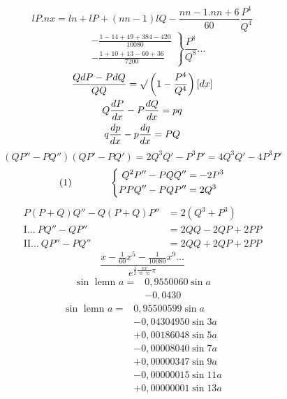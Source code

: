 \begingroup
\setlength{\headheight}{25pt}
\NoSourceHead
{}
\noindent [S. 26]
{\small\[\begin{aligned}
P.nx={}&nQ^{nn-1}P-\frac{n.nn-1.nn+6}{60}Q^{nn-5}P^5\\
&-\frac{n^6-13n^4+36nn+420n.nn-1}{10080}Q^{nn-9}P^9\ldots
\end{aligned}\]}
\[lP.nx=ln+lP+(nn-1)lQ-\frac{nn-1.nn+6}{60}\frac{P^4}{Q^4}\]
\[\left.\begin{aligned}
&-\frac{1-14+49+384-420}{10080}\\[5pt]
&-\frac{1+10+13-60+36}{7200}
\end{aligned}\right\}\frac{P^8}{Q^8}\ldots\]
\noindent [S. 78]
\[\begin{gathered}
\frac{QdP-PdQ}{QQ}=\surd\left(1-\frac{P^4}{Q^4}\right)[dx]\\
Q\frac{dP}{dx}-P\frac{dQ}{dx}=pq\\
q\frac{dp}{dx}-p\frac{dq}{dx}=PQ
\end{gathered}\]
{\small\[(QP''-PQ'')(QP'-PQ')=2Q^3Q'-P^3P'=4Q^3Q'-4P^3P'\]}
\[\begin{array}{l@{\qquad\qquad}l}
(1)&\left\{\begin{aligned}
Q^2P''-PQQ''&=-2P^3\\
PPQ''-PQP''&=2Q^3
\end{aligned}\right.
\end{array}\]
\clearpage
{}
\[\begin{aligned}
P(P+Q)Q''-Q(P+Q)P''&=2(Q^3+P^3)\\
\mathrm{I}\ldots\ PQ''-QP''&=2QQ-2QP+2PP\\
\mathrm{II}\ldots\ QP''-PQ''&=2QQ+2QP+2PP
\end{aligned}\]
\noindent [S. 90]
\[\frac{x-\frac1{60}x^5-\frac1{10080}x^9\ldots}{e^{\frac12\frac{xx}{\varpi\varpi}\pi}}\]
\noindent [S. 92---93]
\[\begin{aligned}
\sin\text{ lemn }a={}&0{,}9550060\sin a\\
&-0{,}0430
\end{aligned}\]
\[\begin{aligned}
\sin\text{ lemn }a={}&0{,}95500599\sin a\\
&-0{,}04304950\sin3a\\
&+0{,}00186048\sin5a\\
&-0{,}00008040\sin7a\\
&+0{,}00000347\sin9a\\
&-0{,}00000015\sin11a\\
&+0{,}00000001\sin13a
\end{aligned}\]
